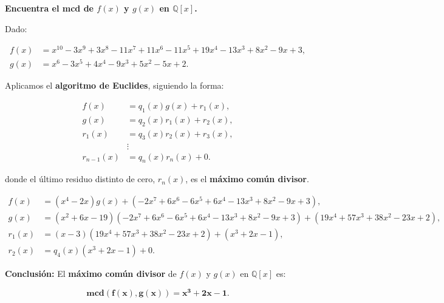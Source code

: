 \documentclass{article}
\begin{document}
\textbf{Encuentra el mcd de \( f(x) \) y \( g(x) \) en \( \mathbb{Q}[x] \).}

Dado:

\[
\begin{aligned}
    f(x) &= x^{10} - 3x^9 + 3x^8 - 11x^7 + 11x^6 - 11x^5 + 19x^4 - 13x^3 + 8x^2 - 9x + 3, \\
    g(x) &= x^6 - 3x^5 + 4x^4 - 9x^3 + 5x^2 - 5x + 2.
\end{aligned}
\]

Aplicamos el \textbf{algoritmo de Euclides}, siguiendo la forma:

\[
\begin{aligned}
    f(x) &= q_1(x) g(x) + r_1(x), \\
    g(x) &= q_2(x) r_1(x) + r_2(x), \\
    r_1(x) &= q_3(x) r_2(x) + r_3(x), \\
    &\vdots \\
    r_{n-1}(x) &= q_n(x) r_n(x) + 0.
\end{aligned}
\]

donde el último residuo distinto de cero, \( r_n(x) \), es el \textbf{máximo común divisor}.


\begin{align*}
    f(x) &= (x^4 - 2x) g(x) + (-2x^7 + 6x^6 - 6x^5 + 6x^4 - 13x^3 + 8x^2 - 9x + 3), \\
    g(x) &= (x^2 + 6x - 19) (-2x^7 + 6x^6 - 6x^5 + 6x^4 - 13x^3 + 8x^2 - 9x + 3) + (19x^4 + 57x^3 + 38x^2 - 23x + 2), \\
    r_1(x) &= (x - 3) (19x^4 + 57x^3 + 38x^2 - 23x + 2) + (x^3 + 2x - 1), \\
    r_2(x) &= q_4(x) (x^3 + 2x - 1) + 0.
\end{align*}

\textbf{Conclusión:} El \textbf{máximo común divisor} de \( f(x) \) y \( g(x) \) en \( \mathbb{Q}[x] \) es:

\[
\mathbf{mcd(f(x), g(x)) = x^3 + 2x - 1.}
\]
\end{document}
